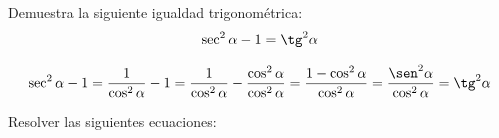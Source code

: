 \documentclass[addpoints,spanish, 12pt,a4paper]{exam}
\begin{document}
\begin{questions}



        \question[2] Demuestra la siguiente igualdad trigonométrica:
        $$\sec^2\alpha-1=\tg^2\alpha$$
        \begin{solution}
        $$\sec^2\alpha-1=\frac{1}{\cos^2\alpha}-1=\frac{1}{\cos^2\alpha}-\frac{\cos^2\alpha}{\cos^2\alpha}=\frac{1-\cos^2\alpha}{\cos^2\alpha}=\frac{\sen^2\alpha}{\cos^2\alpha}=\tg^2\alpha$$
        \end{solution}
        
        \question Resolver las siguientes ecuaciones:
        \begin{multicols}{1} 
        \begin{parts} 
        

\end{parts}
\end{multicols}
\end{questions}
\end{document}

